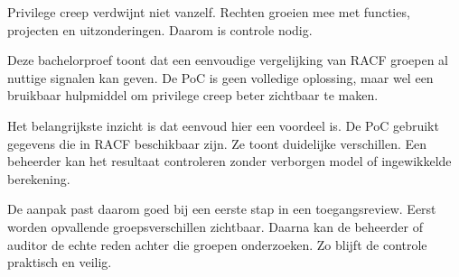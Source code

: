 Privilege creep verdwijnt niet vanzelf. Rechten groeien mee met functies, projecten en uitzonderingen. Daarom is controle nodig.

Deze bachelorproef toont dat een eenvoudige vergelijking van RACF groepen al nuttige signalen kan geven. De PoC is geen volledige oplossing, maar wel een bruikbaar hulpmiddel om privilege creep beter zichtbaar te maken.

Het belangrijkste inzicht is dat eenvoud hier een voordeel is. De PoC gebruikt gegevens die in RACF beschikbaar zijn. Ze toont duidelijke verschillen. Een beheerder kan het resultaat controleren zonder verborgen model of ingewikkelde berekening.

De aanpak past daarom goed bij een eerste stap in een toegangsreview. Eerst worden opvallende groepsverschillen zichtbaar. Daarna kan de beheerder of auditor de echte reden achter die groepen onderzoeken. Zo blijft de controle praktisch en veilig.
